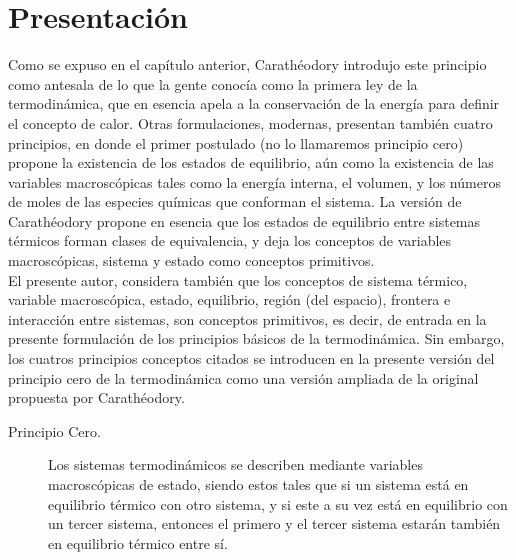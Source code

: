 \section{Presentación}
Como se expuso en el capítulo anterior,  Carathéodory introdujo este principio como antesala de lo que la gente conocía como la primera ley de la termodinámica, que en esencia apela a la conservación de la energía para definir el concepto de calor. Otras formulaciones, modernas, presentan también cuatro principios, en donde el primer postulado (no lo llamaremos principio cero) propone la existencia de los estados de equilibrio, aún como la existencia de las variables macroscópicas tales como la energía interna, el volumen, y los números de moles de las especies químicas que conforman el sistema. La versión de Carathéodory propone en esencia que los estados de equilibrio entre sistemas térmicos forman clases de equivalencia, y deja los conceptos de variables macroscópicas, sistema y estado como conceptos primitivos.\\
El presente autor, considera también que los conceptos de sistema térmico, variable macroscópica, estado, equilibrio, región (del espacio), frontera e interacción entre sistemas, son conceptos primitivos, es decir, de entrada en la presente formulación de los principios básicos de la termodinámica. Sin embargo, los cuatros principios conceptos citados se introducen en la presente versión del principio cero de la termodinámica como una versión ampliada de la original propuesta por Carathéodory.\\

\begin{description}
\item[Principio Cero.] Los sistemas termodinámicos se describen mediante variables macroscópicas de estado, siendo estos tales que si un sistema está en equilibrio  térmico con otro sistema, y si este a su vez está en equilibrio con un tercer sistema, entonces el primero y el tercer sistema estarán también en equilibrio térmico entre sí.\\
\end{description}

